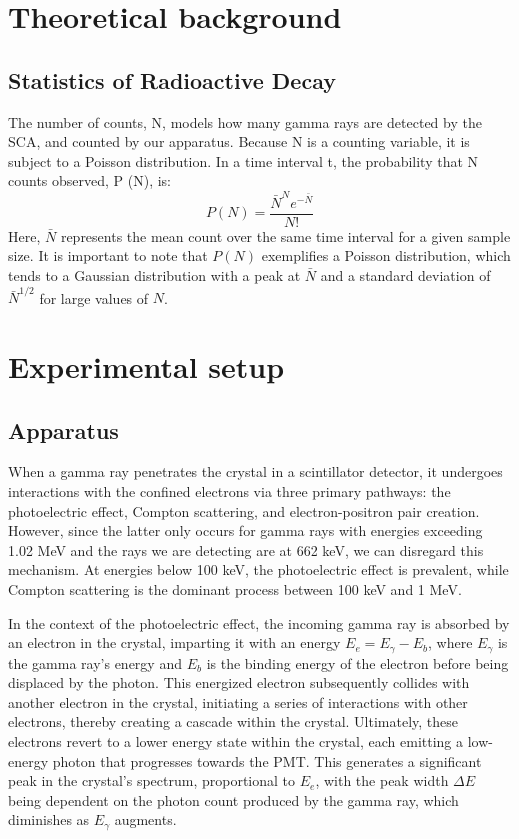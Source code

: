 \documentclass[10pt,letterpaper,onecolumn]{article}
\begin{document}
\section{Theoretical background}
\subsection{Statistics of Radioactive Decay}
The number of counts, N, models how many gamma rays are detected by the SCA, and counted
by our apparatus. Because N is a counting variable, it is subject to a Poisson distribution.
In a time interval t, the probability
that N counts observed, P (N), is:
$$
P(N) = \frac{\bar{N}^N e^{-\bar{N}}}{N!}
$$
Here, \( \bar{N} \) represents the mean 
count over the same time interval for a given sample size.
 It is important to note that \( P(N) \) exemplifies a Poisson distribution, 
 which tends to a Gaussian distribution with a peak at \( \bar{N} \) 
 and a standard deviation of \( \bar{N}^{1/2} \) for large values of \( N \).

\section{Experimental setup}
\subsection{Apparatus}
When a gamma ray penetrates the crystal in a scintillator detector, 
it undergoes interactions with the confined 
electrons via three primary pathways: the photoelectric effect, Compton scattering,
and electron-positron pair creation. However, since the latter only occurs for gamma 
rays with energies exceeding 1.02 MeV and the rays we are detecting are at 662 keV, 
we can disregard this mechanism. At energies below 100 keV, the photoelectric effect 
is prevalent, while Compton scattering is the dominant process between 100 keV and 1 MeV.

In the context of the photoelectric effect, the incoming gamma ray is absorbed by an 
electron in the crystal, imparting it with an energy \(E_e = E_\gamma - E_b\), 
where \(E_\gamma\) is the gamma ray's energy and \(E_b\) is the binding energy of the 
electron before being displaced by the photon. This energized electron subsequently 
collides with another electron in the crystal, initiating a series of interactions with 
other electrons, thereby creating a cascade within the crystal. Ultimately, these 
electrons revert to a lower energy state within the crystal, each emitting a low-energy 
photon that progresses towards the PMT. This generates a significant peak in the
crystal's spectrum, proportional to \(E_e\), with the peak width \(\Delta E\) being 
dependent on the photon count produced by the gamma ray, which diminishes as 
\(E_\gamma\) augments.
\end{document}
